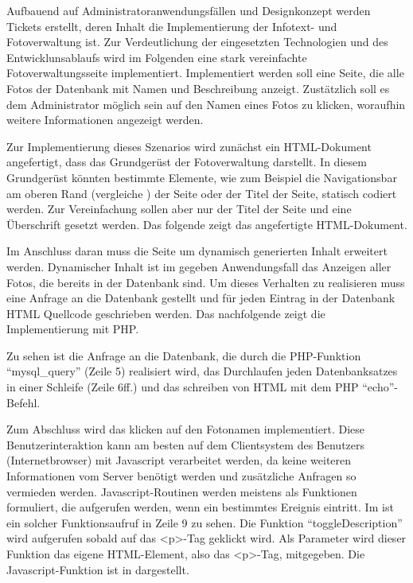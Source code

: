 Aufbauend auf Administratoranwendungsfällen und Designkonzept werden Tickets erstellt, deren Inhalt die Implementierung der Infotext- und Fotoverwaltung ist. Zur Verdeutlichung der eingesetzten Technologien und des Entwicklunsablaufs wird im Folgenden eine stark vereinfachte Fotoverwaltungsseite implementiert. Implementiert werden soll eine Seite, die alle Fotos der Datenbank mit Namen und Beschreibung anzeigt. Zustätzlich soll es dem Administrator möglich sein auf den Namen eines Fotos zu klicken, woraufhin weitere Informationen angezeigt werden.

Zur Implementierung dieses Szenarios wird zunächst ein HTML-Dokument angefertigt, dass das Grundgerüst der Fotoverwaltung darstellt. In diesem Grundgerüst könnten bestimmte Elemente, wie zum Beispiel die Navigationsbar am oberen Rand (vergleiche ) der Seite oder der Titel der Seite, statisch codiert werden. Zur Vereinfachung sollen aber nur der Titel der Seite und eine Überschrift gesetzt werden. Das folgende  zeigt das angefertigte HTML-Dokument.



Im Anschluss daran muss die Seite um dynamisch generierten Inhalt erweitert werden. Dynamischer Inhalt ist im gegeben Anwendungsfall das Anzeigen aller Fotos, die bereits in der Datenbank sind. Um dieses Verhalten zu realisieren muss eine Anfrage an die Datenbank gestellt und für jeden Eintrag in der Datenbank HTML Quellcode geschrieben werden. Das nachfolgende  zeigt die Implementierung mit PHP.



Zu sehen ist die Anfrage an die Datenbank, die durch die PHP-Funktion "`mysql\_query"' (Zeile 5) realisiert wird, das Durchlaufen jeden Datenbanksatzes in einer Schleife (Zeile 6ff.) und das schreiben von HTML mit dem PHP "`echo"'-Befehl.

Zum Abschluss wird das klicken auf den Fotonamen implementiert. Diese Benutzerinteraktion kann am besten auf dem Clientsystem des Benutzers (Internetbrowser) mit Javascript verarbeitet werden, da keine weiteren Informationen vom Server benötigt werden und zusätzliche Anfragen so vermieden werden. Javascript-Routinen werden meistens als Funktionen formuliert, die aufgerufen werden, wenn ein bestimmtes Ereignis eintritt. Im  ist ein solcher Funktionsaufruf in Zeile 9 zu sehen. Die Funktion "`toggleDescription"' wird aufgerufen sobald auf das <p>-Tag geklickt wird. Als Parameter wird dieser Funktion das eigene HTML-Element, also das <p>-Tag, mitgegeben. Die Javascript-Funktion ist in  dargestellt.

